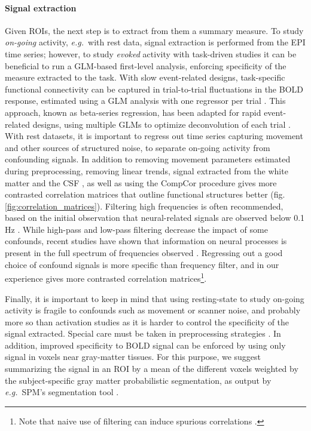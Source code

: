 \documentclass[5p]{elsarticle}
\begin{document}
\paragraph{Signal extraction}
%
Given ROIs, the next step is to extract from them a summary measure. To
study \emph{on-going} activity, \emph{e.g.}\ with rest data, signal
extraction is performed from the EPI time series; however, to study
\emph{evoked} activity with task-driven studies it can be beneficial to
run a GLM-based first-level analysis, enforcing specificity of the measure
extracted to the task. With slow event-related designs, task-specific
functional connectivity can be captured in trial-to-trial fluctuations in
the BOLD response, estimated using a GLM analysis with one regressor per
trial \cite{grillon2012,rissman2004}. This approach, known as beta-series
regression, has been adapted for rapid event-related designs, using
multiple GLMs to optimize deconvolution of each trial \cite{mumford2012}.
With rest datasets, it is important to regress out time series capturing
movement and other sources of structured noise, to separate on-going
activity from confounding signals. In addition to removing movement
parameters estimated during preprocessing, removing linear trends, signal
extracted from the white matter and the CSF \cite{chang2009}, as well as
using the CompCor \cite{behzadi2007} procedure gives more contrasted
correlation matrices that outline functional structures better
(fig.\,\ref{fig:correlation_matrices}). Filtering high frequencies is
often recommended, based on the initial observation that neural-related
signals are observed below 0.1\,Hz \cite{cordes2001,biswal1995}. While
high-pass and low-pass filtering decrease the impact of some confounds,
recent studies have shown that information on neural processes is present
in the full spectrum of frequencies observed
\cite{smith2012,vanoort2012}. Regressing out a good choice of confound
signals is more specific than frequency filter, and in our experience
gives more contrasted correlation matrices\footnote{Note that naive use
of filtering can induce spurious correlations \cite{davey2012}.}.

Finally, it is important to keep in mind that using resting-state to
study on-going activity is fragile to confounds such as movement
\cite{vandijk2012,power2011} or scanner noise, and probably more so than
activation studies as it is harder to control the specificity of the
signal extracted. Special care must be taken in preprocessing strategies
\cite{vandijk2010,satterthwaite2012}.
%
In addition, improved specificity to BOLD signal can be enforced by
using only signal in voxels near gray-matter tissues. For this purpose,
we suggest summarizing the signal in an ROI by a mean of the different voxels
weighted by the subject-specific gray matter probabilistic segmentation,
as output by \emph{e.g.}\ SPM's segmentation tool \cite{ashburner2005}.
\end{document}
